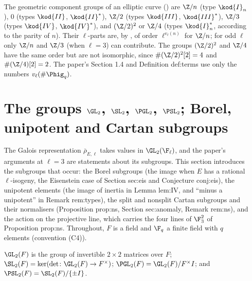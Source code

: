 \begin{example}\label{ex:groups:componentgroups}
The geometric component groups of an elliptic curve () are $\Z/n$ (type $\kod{I}_n$), $0$ (types $\kod{II}$, $\kod{II}^*$), $\Z/2$
(types $\kod{III}$, $\kod{III}^*$), $\Z/3$ (types $\kod{IV}$, $\kod{IV}^*$), and $(\Z/2)^2$ or $\Z/4$ (types $\kod{I}_n^*$, according to the parity of $n$).
Their $\ell$-parts are, by , of order $\ell^{v_\ell(n)}$ for $\Z/n$; for odd $\ell$ only $\Z/n$ and $\Z/3$ (when $\ell=3$) can
contribute. The groups $(\Z/2)^2$ and $\Z/4$ have the same order but are not isomorphic, since $\#(\Z/2)^2[2]=4$ and $\#(\Z/4)[2]=2$. The paper's Section 1.4 and
Definition def:terms use only the numbers $v_\ell(\#\Phig_q)$.
\end{example}

\section[Matrix groups over a field]{The groups \texorpdfstring{$\GL_2$, $\SL_2$, $\PGL_2$, $\PSL_2$}{GL2, SL2, PGL2, PSL2}; Borel, unipotent and Cartan subgroups}\label{sec:groups:matrix}

The Galois representation $\bar\rho_{E,\ell}$ takes values in $\GL_2(\F_\ell)$, and the paper's arguments at $\ell=3$ are statements about its
subgroups. This section introduces the subgroups that occur: the Borel subgroups (the image when $E$ has a rational $\ell$-isogeny, the
Eisenstein case of Section sec:eis and Conjecture conj:eis), the unipotent elements (the image of inertia in Lemma lem:IV, and ``minus a
unipotent'' in Remark rem:types), the split and nonsplit Cartan subgroups and their normalisers (Proposition prop:ns, Section sec:anomaly,
Remark rem:ns), and the action on the projective line, which carries the four lines of $\F_3^2$ of Proposition prop:ns. Throughout, $F$ is a
field and $\F_q$ a finite field with $q$ elements (convention (C4)).

\begin{definition}\label{def:groups:gl2}
$\GL_2(F)$ is the group of invertible $2\times2$ matrices over $F$; $\SL_2(F)=\ker(\det\colon\GL_2(F)\to F^\times)$; $\PGL_2(F)=\GL_2(F)/F^\times I$; and
$\PSL_2(F)=\SL_2(F)/\{\pm I\}$.
\end{definition}

